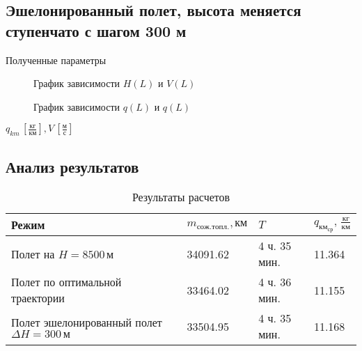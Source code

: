 \subsection{Эшелонированный полет, высота меняется ступенчато с шагом 300 м}

\begin{table}[H]
    \centering
    \caption{Полученные параметры}
    \label{tab:H_300_V_opt}
    
\end{table}

\begin{figure}[H]
    \begin{minipage}{0.48\textwidth}
    \centering
    \caption{График зависимости $H(L)$ и $V(L)$}
    \label{fig:FL_H_V_opt}
    \end{minipage}
    \hfill
    \begin{minipage}{0.48\textwidth}
    \centering
    \caption{График зависимости $q(L)$ и $q(L)$}
    \label{fig:H_300_L_m}
    \end{minipage}
\end{figure}

\begin{table}[H]
\centering
\resizebox{\textwidth-1.4cm}{!}{
    
}
\caption{$q_{km}\, [\frac{кг}{км}], V \, [\frac{м}{с}] $}
\label{t:1}
\end{table}


\subsection{Анализ результатов}
\begin{table}[H]
\centering
\caption{Результаты расчетов}
\label{tab:tab:opt_vs_const_h}
\begin{tabular}{|p{}|p{}|p{}|p{}|}
\hline
Режим & $m_{сож.топл.}, км$ & $T$ & $q_{км_{ср}}, \, \frac{кг}{км}$\\
\hline
Полет на $H=8500\,м$ & 34091.62& 4 ч. 35 мин. & 11.364\\
\hline
Полет по оптимальной траектории & 33464.02 & 4 ч. 36 мин. & 11.155\\
\hline
Полет эшелонированный полет $\Delta H =300\, м$ & 33504.95 & 4 ч. 35 мин. & 11.168\\
\hline
\end{tabular}
\end{table}

